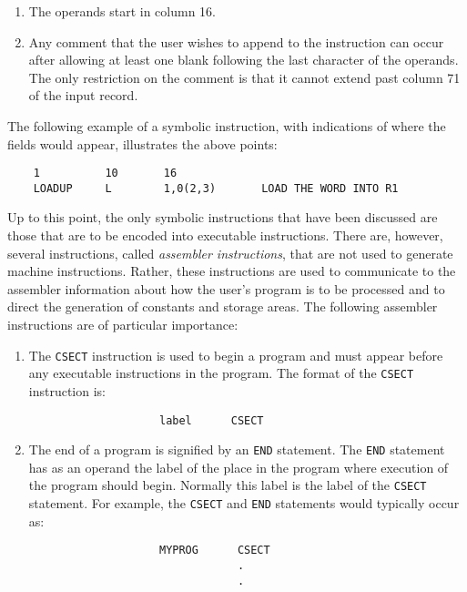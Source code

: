 \documentclass{report}
\begin{document}
\begin{itemize}
\begin{enumerate}
                        \item The operands start in column 16.
                        \item Any comment that the user wishes to append to the instruction can occur after allowing at least one blank following the last character of the operands. The only restriction on the comment is that it cannot extend past column 71 of the input record.
                    \end{enumerate}
                    The following example of a symbolic instruction, with indications of where the fields would appear, illustrates the above points:
                    \begin{verbatim}
    1          10       16
    LOADUP     L        1,0(2,3)       LOAD THE WORD INTO R1
                    \end{verbatim}
                    \bigbreak \noindent 
                    Up to this point, the only symbolic instructions that have been discussed are those that are to be encoded into executable instructions. There are, however, several instructions, called \textit{assembler instructions}, that are not used to generate machine instructions. Rather, these instructions are used to communicate to the assembler information about how the user's program is to be processed and to direct the generation of constants and storage areas. The following assembler instructions are of particular importance:
                    \begin{enumerate}
                        \item The \texttt{CSECT} instruction is used to begin a program and must appear before any executable instructions in the program. The format of the \texttt{CSECT} instruction is:
                            \begin{verbatim}
                    label      CSECT
                            \end{verbatim}
                        \item The end of a program is signified by an \texttt{END} statement. The \texttt{END} statement has as an operand the label of the place in the program where execution of the program should begin. Normally this label is the label of the \texttt{CSECT} statement. For example, the \texttt{CSECT} and \texttt{END} statements would typically occur as:
                            \begin{verbatim}
                    MYPROG      CSECT
                                .
                                .

\end{verbatim}
\end{enumerate}
\end{itemize}
\end{document}
